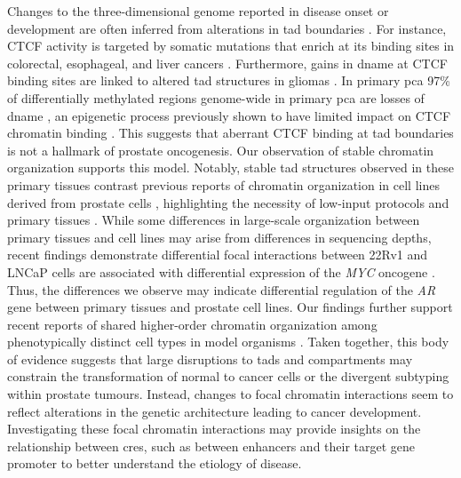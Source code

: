 Changes to the three-dimensional genome reported in disease onset or development are often inferred from alterations in \gls{tad} boundaries \cite{oudelaarRelationshipGenomeStructure2020,akdemirDisruptionChromatinFolding2020}.
For instance, CTCF activity is targeted by somatic mutations that enrich at its binding sites in colorectal, esophageal, and liver cancers \cite{katainenCTCFCohesinbindingSites2015,guoMutationHotspotsCTCF2018}.
Furthermore, gains in \gls{dname} at CTCF binding sites are linked to altered \gls{tad} structures in gliomas \cite{flavahanInsulatorDysfunctionOncogene2016}.
In primary \gls{pca} 97\% of differentially methylated regions genome-wide in primary \gls{pca} are losses of \gls{dname} \cite{zhaoDNAMethylationLandscape2020,yuWholeGenomeMethylationSequencing2013}, an epigenetic process previously shown to have limited impact on CTCF chromatin binding \cite{mauranoRoleDNAMethylation2015}.
This suggests that aberrant CTCF binding at \gls{tad} boundaries is not a hallmark of prostate oncogenesis.
Our observation of stable chromatin organization supports this model.
Notably, stable \gls{tad} structures observed in these primary tissues contrast previous reports of chromatin organization in cell lines derived from prostate cells \cite{taberlayThreedimensionalDisorganizationCancer2016,rhieHighresolution3DEpigenomic2019}, highlighting the necessity of low-input protocols and primary tissues \cite{diazChromatinConformationAnalysis2018}.
While some differences in large-scale organization between primary tissues and cell lines may arise from differences in sequencing depths, recent findings demonstrate differential focal interactions between 22Rv1 and LNCaP cells are associated with differential expression of the \emph{MYC} oncogene \cite{ahmedCRISPRiScreensReveal2021}.
Thus, the differences we observe may indicate differential regulation of the \emph{AR} gene between primary tissues and prostate cell lines.
Our findings further support recent reports of shared higher-order chromatin organization among phenotypically distinct cell types in model organisms \cite{rao3DMapHuman2014,dixonTopologicalDomainsMammalian2012,ing-simmonsIndependenceChromatinConformation2021,ghavi-helmHighlyRearrangedChromosomes2019,iyyankiSubtypeassociatedEpigenomicLandscape2021,akdemirDisruptionChromatinFolding2020}.
Taken together, this body of evidence suggests that large disruptions to \glspl{tad} and compartments may constrain the transformation of normal to cancer cells or the divergent subtyping within prostate tumours.
Instead, changes to focal chromatin interactions seem to reflect alterations in the genetic architecture leading to cancer development.
Investigating these focal chromatin interactions may provide insights on the relationship between \glspl{cre}, such as between enhancers and their target gene promoter \cite{gasperiniComprehensiveCatalogueValidated2020,nasserGenomewideEnhancerMaps2021} to better understand the etiology of disease.

